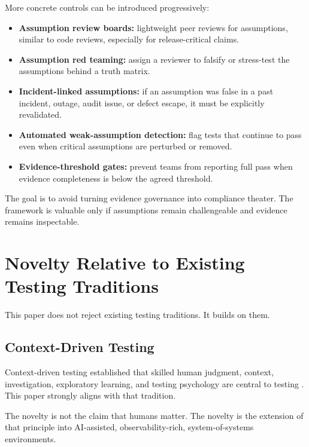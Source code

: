 \documentclass[11pt,a4paper]{article}
\begin{document}
More concrete controls can be introduced progressively:
\begin{itemize}
\item \textbf{Assumption review boards:} lightweight peer reviews for assumptions, similar to code reviews, especially for release-critical claims.
\item \textbf{Assumption red teaming:} assign a reviewer to falsify or stress-test the assumptions behind a truth matrix.
\item \textbf{Incident-linked assumptions:} if an assumption was false in a past incident, outage, audit issue, or defect escape, it must be explicitly revalidated.
\item \textbf{Automated weak-assumption detection:} flag tests that continue to pass even when critical assumptions are perturbed or removed.
\item \textbf{Evidence-threshold gates:} prevent teams from reporting full pass when evidence completeness is below the agreed threshold.
\end{itemize}

The goal is to avoid turning evidence governance into compliance theater. The framework is valuable only if assumptions remain challengeable and evidence remains inspectable.

\section{Novelty Relative to Existing Testing Traditions}

This paper does not reject existing testing traditions. It builds on them.

\subsection{Context-Driven Testing}

Context-driven testing established that skilled human judgment, context, investigation, exploratory learning, and testing psychology are central to testing \cite{kaner,bach,myers}. This paper strongly aligns with that tradition.

The novelty is not the claim that humans matter. The novelty is the extension of that principle into AI-assisted, observability-rich, system-of-systems environments.
\end{document}
